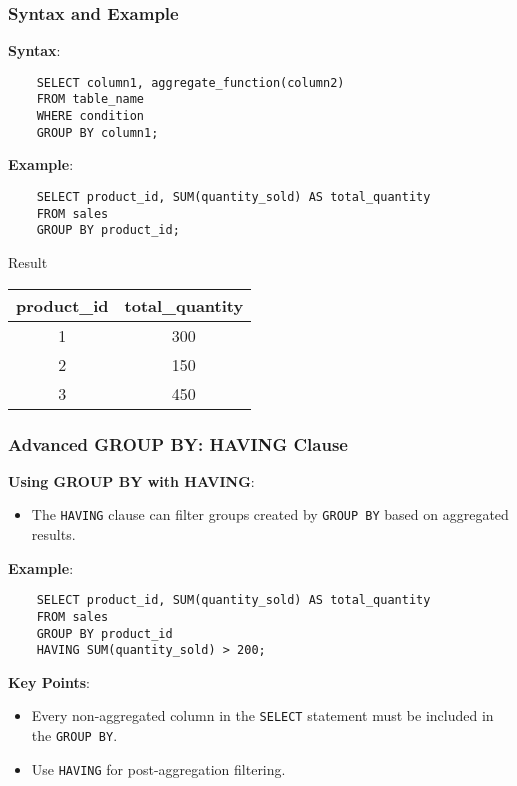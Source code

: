 \documentclass[aspectratio=169]{beamer}
\begin{document}
\begin{frame}[fragile]
    \frametitle{Syntax and Example}
    \textbf{Syntax}:
    \begin{lstlisting}
    SELECT column1, aggregate_function(column2)
    FROM table_name
    WHERE condition
    GROUP BY column1;
    \end{lstlisting}
    
    \textbf{Example}:
    \begin{lstlisting}
    SELECT product_id, SUM(quantity_sold) AS total_quantity
    FROM sales
    GROUP BY product_id;
    \end{lstlisting}
    \begin{block}{Result}
        \begin{tabular}{|c|c|}
            \hline
            product\_id & total\_quantity \\
            \hline
            1           & 300            \\
            2           & 150            \\
            3           & 450            \\
            \hline
        \end{tabular}
    \end{block}
\end{frame}

\begin{frame}[fragile]
    \frametitle{Advanced GROUP BY: HAVING Clause}
    \textbf{Using GROUP BY with HAVING}:
    \begin{itemize}
        \item The \texttt{HAVING} clause can filter groups created by \texttt{GROUP BY} based on aggregated results.
    \end{itemize}
    
    \textbf{Example}:
    \begin{lstlisting}
    SELECT product_id, SUM(quantity_sold) AS total_quantity
    FROM sales
    GROUP BY product_id
    HAVING SUM(quantity_sold) > 200;
    \end{lstlisting}
    
    \textbf{Key Points}:
    \begin{itemize}
        \item Every non-aggregated column in the \texttt{SELECT} statement must be included in the \texttt{GROUP BY}.
        \item Use \texttt{HAVING} for post-aggregation filtering.
    \end{itemize}
\end{frame}
\end{document}
